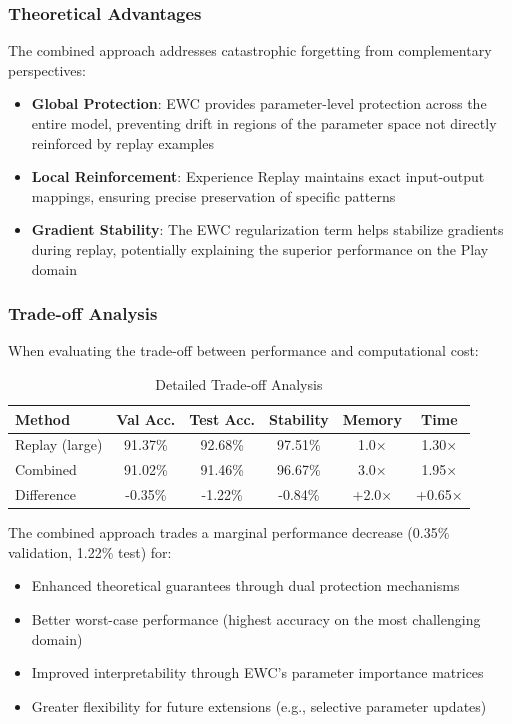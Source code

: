 \documentclass[conference]{IEEEtran}
\begin{document}
\subsubsection{Theoretical Advantages}
The combined approach addresses catastrophic forgetting from complementary perspectives:
\begin{itemize}
    \item \textbf{Global Protection}: EWC provides parameter-level protection across the entire model, preventing drift in regions of the parameter space not directly reinforced by replay examples
    \item \textbf{Local Reinforcement}: Experience Replay maintains exact input-output mappings, ensuring precise preservation of specific patterns
    \item \textbf{Gradient Stability}: The EWC regularization term helps stabilize gradients during replay, potentially explaining the superior performance on the Play domain
\end{itemize}

\subsubsection{Trade-off Analysis}
When evaluating the trade-off between performance and computational cost:

\begin{table}[h]
\caption{Detailed Trade-off Analysis}
\centering
\begin{tabular}{lccccc}
\hline
\textbf{Method} & \textbf{Val Acc.} & \textbf{Test Acc.} & \textbf{Stability} & \textbf{Memory} & \textbf{Time} \\
\hline
Replay (large) & 91.37\% & 92.68\% & 97.51\% & 1.0× & 1.30× \\
Combined & 91.02\% & 91.46\% & 96.67\% & 3.0× & 1.95× \\
Difference & -0.35\% & -1.22\% & -0.84\% & +2.0× & +0.65× \\
\hline
\end{tabular}
\end{table}

The combined approach trades a marginal performance decrease (0.35\% validation, 1.22\% test) for:
\begin{itemize}
    \item Enhanced theoretical guarantees through dual protection mechanisms
    \item Better worst-case performance (highest accuracy on the most challenging domain)
    \item Improved interpretability through EWC's parameter importance matrices
    \item Greater flexibility for future extensions (e.g., selective parameter updates)
\end{itemize}
\end{document}
